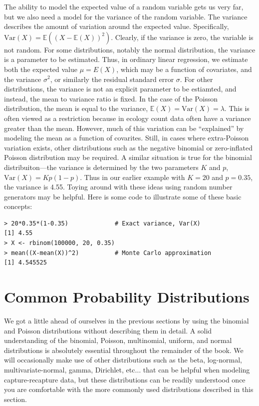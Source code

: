 The ability to model the expected value of a random variable gets us
very far, but we also need a model for the variance of the random
variable. The variance %
describes the amount of variation around the expected
value. Specifically, $\text{Var}(X) = \mathbb{E}((X -
\mathbb{E}(X))^2)$. Clearly, if the variance is zero, the variable is
not random.
For some distributions, notably the normal distribution, the variance
is a parameter to be estimated. Thus, in ordinary linear regression,
we estimate both the expected value $\mu=E(X)$,
which may be a function of covariates, and the variance
$\sigma^2$, or similarly the residual standard error $\sigma$. For
other distributions, the variance is not an explicit parameter to be
estiamted, and instead, the mean to variance ratio is fixed. In the
case of the Poisson distribution, the mean is equal to the
variance, $\mathbb{E}(X) = \text{Var}(X) = \lambda$. This is often viewed as a restriction because in ecology
count data often have a variance greater than the mean. However, much
of this variation can be ``explained'' by modeling the mean as a
function of covarites. Still, in cases where extra-Poisson variation
exists, other distributions such as the negative binomial or
zero-inflated Poisson distribution may be required. A similar
situation is true for the binomial distribuiton---the variance is
determined by the two parameters $K$ and $p$, $\text{Var}(X) = Kp(1-p)$. Thus
in our earlier example with $K=20$ and $p=0.35$, the variance is
4.55. Toying around with these ideas using random number generators
may be helpful. Here is some code to illustrate some of these basic concepts:
\begin{verbatim}
> 20*0.35*(1-0.35)             # Exact variance, Var(X)
[1] 4.55
> X <- rbinom(100000, 20, 0.35)
> mean((X-mean(X))^2)          # Monte Carlo approximation
[1] 4.545525
\end{verbatim}



\section{Common Probability Distributions}
\label{sec.modeling.distributions}

We got a little ahead of ourselves in the previous sections by using
the binomial and Poisson distributions without describing them in detail.
A solid understanding of the binomial, Poisson, multinomial, uniform,
and normal distributions is absolutely essential throughout the
remainder of the book. We will occasionally make use of other
distributions such as the beta, log-normal, multivariate-normal,
gamma, Dirichlet, etc$\dots$ that can be helpful when
modeling capture-recapture data, but these distributions can be
readily understood once you are comfortable with the more commonly
used distributions described in this section.

